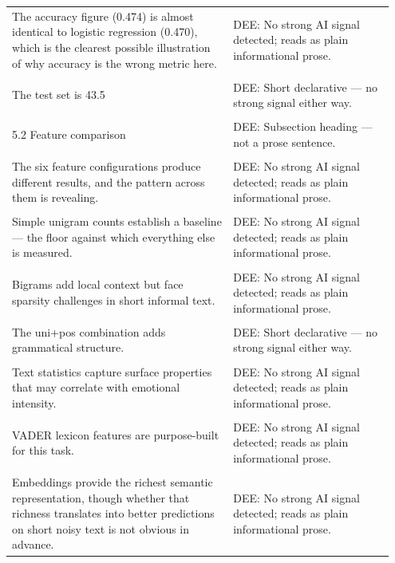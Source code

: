 \documentclass[11pt]{article}
\begin{document}
\begin{longtable}{|p{0.55\linewidth}|p{0.40\linewidth}|}
\hline
\rule{0pt}{3.5cm} & \\
\hline
The accuracy figure (0.474) is almost identical to logistic regression (0.470), which is the clearest possible illustration of why accuracy is the wrong metric here. & DEE: No strong AI signal detected; reads as plain informational prose. \\[2pt]
\hline
\rule{0pt}{3.5cm} & \\
\hline
The test set is 43.5 & DEE: Short declarative --- no strong signal either way. \\[2pt]
\hline
\rule{0pt}{3.5cm} & \\
\hline
5.2 Feature comparison & DEE: Subsection heading --- not a prose sentence. \\[2pt]
\hline
\rule{0pt}{3.5cm} & \\
\hline
The six feature configurations produce different results, and the pattern across them is revealing. & DEE: No strong AI signal detected; reads as plain informational prose. \\[2pt]
\hline
\rule{0pt}{3.5cm} & \\
\hline
Simple unigram counts establish a baseline --- the floor against which everything else is measured. & DEE: No strong AI signal detected; reads as plain informational prose. \\[2pt]
\hline
\rule{0pt}{3.5cm} & \\
\hline
Bigrams add local context but face sparsity challenges in short informal text. & DEE: No strong AI signal detected; reads as plain informational prose. \\[2pt]
\hline
\rule{0pt}{3.5cm} & \\
\hline
The uni+pos combination adds grammatical structure. & DEE: Short declarative --- no strong signal either way. \\[2pt]
\hline
\rule{0pt}{3.5cm} & \\
\hline
Text statistics capture surface properties that may correlate with emotional intensity. & DEE: No strong AI signal detected; reads as plain informational prose. \\[2pt]
\hline
\rule{0pt}{3.5cm} & \\
\hline
VADER lexicon features are purpose-built for this task. & DEE: No strong AI signal detected; reads as plain informational prose. \\[2pt]
\hline
\rule{0pt}{3.5cm} & \\
\hline
Embeddings provide the richest semantic representation, though whether that richness translates into better predictions on short noisy text is not obvious in advance. & DEE: No strong AI signal detected; reads as plain informational prose. \\[2pt]

\end{longtable}
\end{document}
